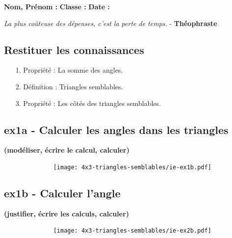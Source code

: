 \newpage

\textbf{Nom, Prénom :} \hspace{8cm} \textbf{Classe :} \hspace{3cm} \textbf{Date :}\\

\begin{center}
  \textit{La plus coûteuse des dépenses, c’est la perte de temps.}  - \textbf{Théophraste}
\end{center}

\subsection*{Restituer les connaissances}

\begin{enumerate}
  \item[1.] Propriété : La somme des angles. \newline \Pointilles[1]
  \item[2.] Définition : Triangles semblables. \newline \Pointilles[1]
  \item[3.] Propriété : Les côtés des triangles semblables. \newline \Pointilles[1]
\end{enumerate}

\subsection*{ex1a - Calculer les angles dans les triangles}
\textbf{(modéliser, écrire le calcul, calculer)}

\begin{figure}[H]
      \centering
      \texttt{[image: 4x3-triangles-semblables/ie-ex1b.pdf]}
\end{figure}
\Pointilles[2]

\begin{minipage}[t]{0.55\textwidth}
  \subsection*{ex1b - Calculer l'angle}
  \textbf{(justifier, écrire les calculs, calculer)}
  \Pointilles[6]
\end{minipage}
\begin{minipage}[t]{0.4\textwidth}
  \begin{figure}[H]
        \centering
        \texttt{[image: 4x3-triangles-semblables/ie-ex2b.pdf]}
  \end{figure}
\end{minipage}

